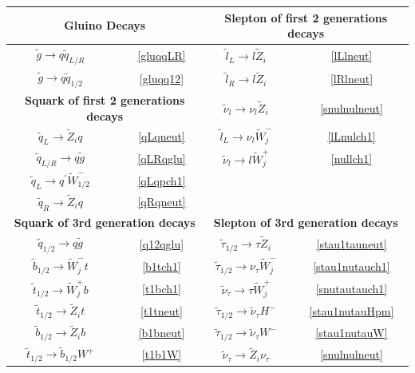 \documentclass[final,3p,times,pdflatex]{elsarticle}
\begin{document}
\begin{center}
\begin{table}
\centering
\begin{tabular}{|c|c|c|c|} \hline
\multicolumn{2}{|c|}{\bf{Gluino Decays}} &  \multicolumn{2}{c|}{\bf{Slepton of first 2 generations decays}} \\ \hline
$\tilde{g} \rightarrow q \tilde{q}_{L/R}$ &~\ref{gluqqLR} &  $\tilde{l}_L \rightarrow l \tilde{Z}_i$ &~\ref{lLlneut} \\ \hline
$\tilde{g} \rightarrow q \tilde{q}_{1/2}$ &~\ref{gluqq12} & $\tilde{l}_R \rightarrow l \tilde{Z}_i$ &~\ref{lRlneut} \\ \hline
\multicolumn{2}{|c|}{\bf{Squark of first 2 generations decays}} & $\tilde{\nu}_l \rightarrow \nu_l \tilde{Z}_i$ &~\ref{snulnulneut} \\ \hline
$\tilde{q}_L \rightarrow \tilde{Z}_i q$ &~\ref{qLqneut} &  $\tilde{l}_L \rightarrow \nu_l \tilde{W}_{j}^{-}$ &~\ref{lLnulch1} \\ \hline
$\tilde{q}_{L/R} \rightarrow q \tilde{g}$ &~\ref{qLRqglu} & $\tilde{\nu}_l \rightarrow l \tilde{W}_{j}^{+}$ &~\ref{nullch1} \\ \hline
$\tilde{q}_{L} \rightarrow q^{'} \tilde{W}_{1/2}^-$ &~\ref{qLqpch1} & & \\ \hline
$\tilde{q}_R \rightarrow \tilde{Z}_i q$ &~\ref{qRqneut} &  & \\ \hline
\multicolumn{2}{|c|}{\bf{Squark of 3rd generation decays}} & \multicolumn{2}{c|}{\bf{Slepton of 3rd generation decays}} \\ \hline
$\tilde{q}_{1/2} \rightarrow q \tilde{g}$ &~\ref{q12qglu} & $\tilde{\tau}_{1/2} \rightarrow \tau \tilde{Z}_i$ &~\ref{stau1tauneut} \\ \hline
$\tilde{b}_{1/2} \rightarrow \tilde{W}_{j}^- t$ &~\ref{b1tch1} & $\tilde{\tau}_{1/2} \rightarrow \nu_\tau \tilde{W}_{j}^{-}$ &~\ref{stau1nutauch1} \\ \hline
$\tilde{t}_{1/2} \rightarrow \tilde{W}_{j}^+ b$ &~\ref{t1bch1} & $\tilde{\nu}_\tau \rightarrow \tau \tilde{W}_{j}^{+}$ &~\ref{snutautauch1} \\ \hline
$\tilde{t}_{1/2} \rightarrow \tilde{Z}_i t$ &~\ref{t1tneut} & $\tilde{\tau}_{1/2} \rightarrow \tilde{\nu}_\tau H^-$ &~\ref{stau1nutauHpm} \\ \hline
$\tilde{b}_{1/2} \rightarrow \tilde{Z}_i b$ &~\ref{b1bneut} & $\tilde{\tau}_{1/2} \rightarrow \tilde{\nu}_\tau W^-$ &~\ref{stau1nutauW} \\ \hline
$\tilde{t}_{1/2} \rightarrow \tilde{b}_{1/2} W^+$ &~\ref{t1b1W} & $\tilde{\nu}_{\tau} \rightarrow \tilde{Z}_i \nu_{\tau}$ &~\ref{snulnulneut} \\ \hline

\end{tabular}
\end{table}
\end{center}
\end{document}
